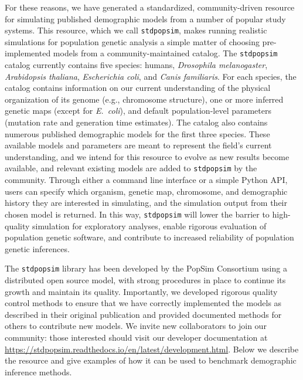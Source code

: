 \documentclass[12pt,halfline,a4paper]{ouparticle}
\newcommand{\stdpopsim}{\texttt{stdpopsim}\xspace}
\begin{document}
For these reasons, we have generated a standardized, community-driven resource
for simulating published demographic models from a number of popular study systems.
This resource, which we call \stdpopsim, makes running
realistic simulations for population genetic analysis a simple matter of
choosing pre-implemented models from a community-maintained catalog.
The \stdpopsim catalog currently contains five species: humans,
\textit{Drosophila melanogaster}, \textit{Arabidopsis thaliana},
\textit{Escherichia coli}, and \textit{Canis familiaris}.
For each species, the catalog contains information on our current understanding of
the physical organization of its genome (e.g., chromosome structure),
one or more inferred genetic maps (except for \textit{E.~coli}),
and default population-level parameters (mutation rate and generation time estimates).
The catalog also contains numerous published demographic models for the first three species.
These available models and parameters are meant to represent the field's current understanding,
and we intend for this resource to evolve as new results become available, and relevant
existing models are added to \stdpopsim by the community.
Through either a command line interface or a simple Python API, users can specify which
organism, genetic map, chromosome, and demographic history they are interested in simulating, and the
simulation output from their chosen model is returned.
In this way, \stdpopsim will lower the barrier to high-quality simulation for exploratory analyses,
enable rigorous evaluation of population genetic software,
and contribute to increased reliability of population genetic inferences.


The \stdpopsim library has been developed by the PopSim Consortium using a
distributed open source model, with strong procedures in place
to continue its growth and maintain its quality.
Importantly, we developed rigorous quality control methods to ensure that we have
correctly implemented the models as described in their original publication
and provided documented methods for others to contribute new models.
We invite new collaborators to join our community:
those interested should visit our developer documentation at
\url{https://stdpopsim.readthedocs.io/en/latest/development.html}.
Below we describe the resource and give
examples of how it can be used to benchmark demographic inference methods.
\end{document}
